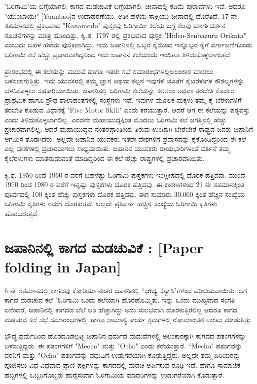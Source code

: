 'ಓರಿಗಾಮಿ'ಯ ಬಗ್ಗೆಯಾಗಲಿ, ಕಾಗದ ಮಡಚುವಿಕೆ ಬಗ್ಗೆಯಾಗಲಿ, ಚೀನಾದಲ್ಲಿ ಕಡಿಮೆ ಪುರಾವೆಗಳು ಇವೆ. ಆದರೂ "ಯುಂಬಾಯೇ" [Yuanbao]ನ ಉದಾಹರಣೆಯು. ಅತೀ ಹಳೆಯ ಸಾಕ್ಷಿಯು ಚೀನಾದಲ್ಲಿ ದೊರೆತಿದೆ. 17 ನೇ ಶತಮಾನದಲ್ಲಿ ಪ್ರಕಟವಾದ "Kanamodo" ಪುಸ್ತಕವು ಓರಿಗಾಮೀ ಕಲೆಯ ಬಗ್ಗೆ ಕೆಲವು ಮಾರ್ಗದರ್ಶನ ಸೂಚನೆಗಳನ್ನು ಮಾತ್ರ ಹೊಂದಿತ್ತು. ಕಿೃ.ಶ. 1797 ರಲ್ಲಿ ಪ್ರಕಟವಾದ ಪುಸ್ತಕ  "Hiden-Senbazuru Orikata" ಎಂಬುದು ಬಹಳ ಹಳೆಯ ಪುಸ್ತಕವಾಗಿದ್ದು. ಇದು ಜಪಾನಿನಲ್ಲಿ ಒಬ್ಬರ  ಕೈಯಿಂದ ಇನ್ನೊಬ್ಬರ ಕೈಗೆ ವರ್ಗಾವಣಿಗೊಂಡು ಓರಿಗಾಮಿ ಕಲೆ ಹೆಚ್ಚು ಪ್ರಚಾರವಾಗಿದ್ದರಿಂದ ಇದು ಜಪಾನಿನ ಕಲೆಯಂದು ಇಂದಿಗೂ ತಿಳಿದುಕೊಳ್ಳಲಾಗುತ್ತದೆ. 


ಪ್ರಾರಂಭದಲ್ಲಿ ಈ ಕಲೆಯನ್ನು ಮದುವೆ ಹಾಗೂ ಇತರೇ ಸಭೆ ಸಮಾರಂಭಗಳಲ್ಲಿ\break ಅಲಂಕಾರ ಮಾಡಲು ಬಳಸಲಾಗುತ್ತಿತ್ತು. ಇದು ಯುವಕರಲ್ಲಿ ತಮ್ಮ ಜ್ಞಾನ ಅಥವಾ ಕಲ್ಪನೆ ಇವುಗಳ ಜೊತೆಗೆ ಕೈಬೆರಳುಗಳ ಕೌಶಲ್ಯಗಳನ್ನು ಬೆಳಸಿಕೊಳ್ಳಲು ಸಹಕಾರಿಯಾಯಿತು. ಜಪಾನಿನಲ್ಲಿ ಓರಿಗಾಮಿ ಕಲೆಯನ್ನು ಕಲಿಸಲು ಅಥವಾ ತರಬೇತಿ ಕೊಡಲು ಪ್ರಾಥಮಿಕ ಹಾಗೂ ಪ್ರೌಢ ಶಾಲಾಹಂತಗಳಲ್ಲಿ ಸಂಸ್ಥೆಗಳು ಇವೆ. ಇವುಗಳ ಮೂಲಕ ಮಕ್ಕಳು ತಮ್ಮ ಕೈ ಬೆರಳುಗಳಿಗೆ ತರಬೇತಿ ಕೊಡುವ ವಿಧಾನಕ್ಕೆ "Five Motor Skill" ಎಂದು ಕರೆಯುತ್ತಾರೆ. ಆದರೆ ಆಗ ಈ ಕಲೆಯನ್ನು ಪಠ್ಯವಸ್ತು ಎಂದು ತಿಳಿದುಕೊಳ್ಳಲಾಗಲಿಲ್ಲ. ಎರಡನೇ ಮಹಾಯುದ್ದಕ್ಕಿಂತ ಮೊದಲು ಓರಿಗಾಮಿ ಕಲೆ ಜಗತ್ತಿನಲ್ಲಿ ಹೆಚ್ಚು ಪ್ರಚಾರವಾಗಲಿಲ್ಲ. ಆದರೆ ಮಹಾಯುದ್ಧದ ನಂತರ\break ಪ್ರಾಂತೀಯ ತಿರುವು ಉಂಟಾಗಿ ಬೇರೆಬೇರೆ ರಾಷ್ಟ್ರದ ಜನರು ಜಪಾನಿಗೆ ಆಗಮಿಸ ತೊಡಗಿದರು. ಅಲ್ಲದೇ  ಜಪಾನಿನ ಯುವಕರು ಇತರೇ ದೇಶಗಳಿಗೆ ಪ್ರವಾಸವನ್ನು ಕೈಕೊಂಡಿದ್ದರಿಂದ ಈ ಕಲೆ ಎಲ್ಲ ದೇಶಗಳಲ್ಲಿ ಪ್ರಚಾರವಾಗಲು ಸಾಧ್ಯವಾಯಿತು. ಜಪಾನಿನ ಯುವಕರು ರಾಯಭಾರಿಗಳಂತೆ ವರ್ತಿನೆ ತಮ್ಮ ಕೈಬೆರಳುಗಳು ಮಾತನಾಡುವಂತೆ ಮಾಡಿದ್ದರಿಂದ ಈ ಕಲೆ ಹೆಚ್ಚು ರಾಷ್ಟ್ರಗಳಲ್ಲಿ ಪ್ರಚಾರವಾಯಿತು. 


ಕಿೃ.ಶ. 1950 ರಿಂದ 1960 ರ ವರಗೆ ಬಹಳಷ್ಟು ಓರಿಗಾಮಿ ಪುಸ್ತಕಗಳು ಇಂಗ್ಲೀಷದಲ್ಲಿ ದೊರಕ ಹತ್ತಿದವು. ಮುಂದೆ 1970 ರಿಂದ 1980 ರ ವರೆಗೆ ಇನ್ನಷ್ಟು ಪುಸ್ತಕಗಳು ದೊರಕ ಹತ್ತಿದವು. ಈ ಕಾರಣಗಳಿಂದ 21 ನೇ ಶತಮಾನಕ್ಕಿಂತ ಪೂರ್ವದಲ್ಲಿ 100 ಕ್ಕಿಂತ ಹೆಚ್ಚು ಪುಸ್ತಕಗಳು ದೊರಕ ಹತ್ತಿದವು. ಈಗ ಸುಮಾರು 30,000 ಕ್ಕಿಂತ ಹೆಚ್ಚಿನ ಸಂಖ್ಯೆಯ ಓರಿಗಾಮಿ ಕೃತಿಗಳು ನಮಗೆ ದೊರಕುತ್ತವೆ. ಅಲ್ಲದೇ ಪ್ರತಿವರ್ಗ ಹೆಚ್ಚಿನ ಸಂಖ್ಯೆಯ ಓರಿಗಾಮಿ ಕೃತಿಗಳು ಹೊರ\break ಬರುತ್ತದೆ. 

\section*{ಜಪಾನಿನಲ್ಲಿ ಕಾಗದ ಮಡಚುವಿಕೆ : [Paper folding in Japan]} 
6 ನೇ ಶತಮಾನದಲ್ಲಿ ಕಾಗದವು ಕೋರಿಯಾ ನಂತರ ಜಪಾನಿನಲ್ಲಿ ``ಭೌಧ್ಯ ಸನ್ಯಾಸಿ"ಗಳಿಂದ ಪರಿಚಯವಾಯಿತು. ಆಗ ಕಾಗದ ಮಡಚುವ ಕಲೆ "ಓರಿಗಾಮಿ ಒಂದು ಕಲೆಯಾಗಿ ಹೊರ\break  ಹೊಮ್ಮಿತು. ಇನ್ನು ಒಂದು ಮುಖ್ಯವಾದ ಸಂಗತಿ ಏನೆಂದರೆ, ಜಪಾನಿನಲ್ಲಿ ಕಾಗದದ ಬೆಲೆ ಅತಿ ಹೆಚ್ಚಾಗಿದ್ದು ಅದು ಸುಲಭವಾಗಿ ದೊರಕುತ್ತಿರಲಿಲ್ಲ ಆದರೂ ಕಾಗದ ಮಡಚುವ ಕಲೆ ಸಭೆ ಸಮಾರಂಭಗಳಲ್ಲಿ ಹಾಗೂ ಸಾಮಾನ್ಯ ಕಾರ್ಯ ಕ್ರಮಗಳಲ್ಲಿ ರೋಮಾಂಚನ ಉಂಟು ಮಾಡುತ್ತಿತ್ತು. 

ಭೌದ್ಧ ಧರ್ಮದಿಂದ ಹೊರದೂಡಲ್ಪಟ್ಟ ಜಪಾನಿನ ಧರ್ಮದ ಮದುವೆಗಳಲ್ಲಿ ಅಲಂಕಾರಕ್ಕಾಗಿ ಕಾಗದದ ಪತಂಗಗಳನ್ನು ಬಳಸುತ್ತಿದ್ದರು. ಈ ಪತಂಗಗಳಿಗೆ  "Mecho" ಮತ್ತು  "Ocho" ಎಂದು ಕರೆಯುತ್ತಾರೆ. ``Mecho" ಪತಂಗವನ್ನು ವರನಿಗೆ ಮತ್ತು "Ocho" ಪತಂಗವನ್ನು ವಧುವಿಗೆ ಉಡುಗರೆಯಾಗಿ ಕೊಡುತ್ತಿದ್ದರು. ಅಲ್ಲದೇ ತಮ್ಮ ಹಿರಿಯರನ್ನು ಪೂಜಿಸಲು ವಿಧ ವಿಧವಾದ ಪ್ರಾಣಿ-ಪಕ್ಷಿಗಳನ್ನು ಕಾಗದದಲ್ಲಿ ಮಡಚಿ ಅರ್ಪಿಸುವ ರೂಢಿ ಇದೆ. ಹಾಗೂ ಸಾಮಾಜಿಕ ಹಬ್ಬಗಳಲ್ಲಿ ಒಬ್ಬರಿಗೊಬ್ಬರು ಹಾರೈಸುವಾಗ ಓರಿಗಾಮಿಯ ಮಾದರಿಗಳನ್ನು ಉಡುಗರೆಯಾಗಿ ಕೊಡುತ್ತಾರೆ. 

